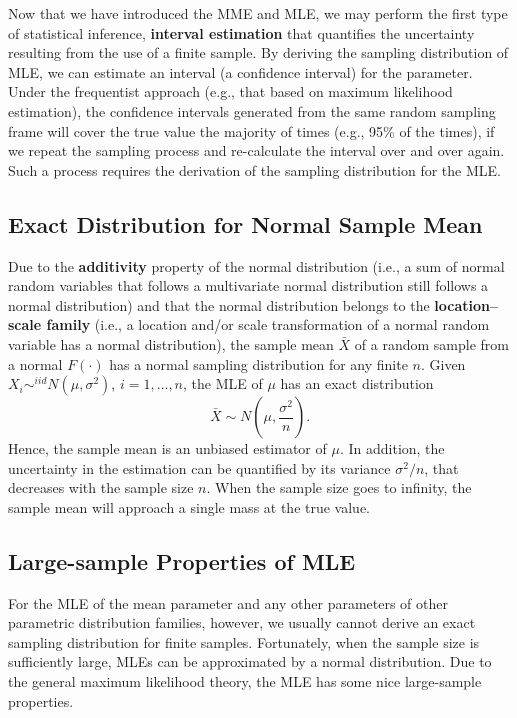\documentclass[]{book}
\theoremstyle{definition}
\theoremstyle{definition}
\theoremstyle{definition}
\theoremstyle{remark}
\begin{document}
Now that we have introduced the MME and MLE, we may perform the first
type of statistical inference, \textbf{interval estimation} that
quantifies the uncertainty resulting from the use of a finite sample. By
deriving the sampling distribution of MLE, we can estimate an interval
(a confidence interval) for the parameter. Under the frequentist
approach (e.g., that based on maximum likelihood estimation), the
confidence intervals generated from the same random sampling frame will
cover the true value the majority of times (e.g., 95\% of the times), if
we repeat the sampling process and re-calculate the interval over and
over again. Such a process requires the derivation of the sampling
distribution for the MLE.

\subsection{Exact Distribution for Normal Sample
Mean}\label{S:TS1:IE:ED}

Due to the \textbf{additivity} property of the normal distribution
(i.e., a sum of normal random variables that follows a multivariate
normal distribution still follows a normal distribution) and that the
normal distribution belongs to the \textbf{location--scale family}
(i.e., a location and/or scale transformation of a normal random
variable has a normal distribution), the sample mean \(\bar{X}\) of a
random sample from a normal \(F(\cdot)\) has a normal sampling
distribution for any finite \(n\). Given
\(X_i\sim^{iid} N(\mu,\sigma^2)\), \(i=1,\dots,n\), the MLE of \(\mu\)
has an exact distribution
\[\bar{X}\sim N\left(\mu,\frac{\sigma^2}{n}\right).\] Hence, the sample
mean is an unbiased estimator of \(\mu\). In addition, the uncertainty
in the estimation can be quantified by its variance \(\sigma^2/n\), that
decreases with the sample size \(n\). When the sample size goes to
infinity, the sample mean will approach a single mass at the true value.

\subsection{Large-sample Properties of
MLE}\label{large-sample-properties-of-mle}

For the MLE of the mean parameter and any other parameters of other
parametric distribution families, however, we usually cannot derive an
exact sampling distribution for finite samples. Fortunately, when the
sample size is sufficiently large, MLEs can be approximated by a normal
distribution. Due to the general maximum likelihood theory, the MLE has
some nice large-sample properties.
\end{document}
